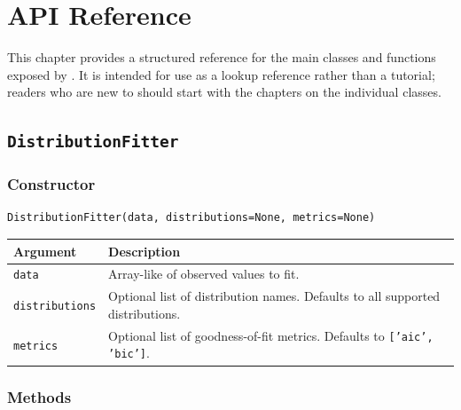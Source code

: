 \chapter{API Reference}
\label{chap:api_reference}

This chapter provides a structured reference for the main classes and
functions exposed by \actsim. It is intended for use as a lookup
reference rather than a tutorial; readers who are new to \actsim should
start with the chapters on the individual classes.

\section{\texttt{DistributionFitter}}
\label{api:distribution_fitter}

\subsection*{Constructor}

\begin{lstlisting}[style=pythonstyle]
DistributionFitter(data, distributions=None, metrics=None)
\end{lstlisting}

\begin{longtable}{p{}p{}}
\toprule
\textbf{Argument} & \textbf{Description} \\
\midrule
\endhead
\texttt{data}          & Array-like of observed values to fit. \\
\texttt{distributions} & Optional list of distribution names. Defaults to
                         all supported distributions. \\
\texttt{metrics}       & Optional list of goodness-of-fit metrics.
                         Defaults to \texttt{['aic', 'bic']}. \\
\bottomrule
\end{longtable}

\subsection*{Methods}

